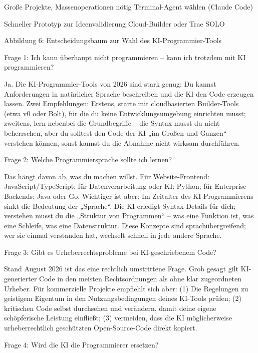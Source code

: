 Große Projekte, Massenoperationen nötig Terminal-Agent wählen (Claude Code)

Schneller Prototyp zur Ideenvalidierung Cloud-Builder oder Trae SOLO

\begin{center}\small\color{gray}Abbildung 6: Entscheidungsbaum zur Wahl des KI-Programmier-Tools\end{center}


Frage 1: Ich kann überhaupt nicht programmieren – kann ich trotzdem mit KI programmieren?

Ja. Die KI-Programmier-Tools von 2026 sind stark genug: Du kannst Anforderungen in natürlicher Sprache beschreiben und die KI den Code erzeugen lassen. Zwei Empfehlungen: Erstens, starte mit cloudbasierten Builder-Tools (etwa v0 oder Bolt), für die du keine Entwicklungsumgebung einrichten musst; zweitens, lern nebenbei die Grundbegriffe – die Syntax musst du nicht beherrschen, aber du solltest den Code der KI „im Großen und Ganzen“ verstehen können, sonst kannst du die Abnahme nicht wirksam durchführen.

Frage 2: Welche Programmiersprache sollte ich lernen?

Das hängt davon ab, was du machen willst. Für Website-Frontend: JavaScript/TypeScript; für Datenverarbeitung oder KI: Python; für Enterprise-Backends: Java oder Go. Wichtiger ist aber: Im Zeitalter des KI-Programmierens sinkt die Bedeutung der „Sprache“. Die KI erledigt Syntax-Details für dich; verstehen musst du die „Struktur von Programmen“ – was eine Funktion ist, was eine Schleife, was eine Datenstruktur. Diese Konzepte sind sprachübergreifend; wer sie einmal verstanden hat, wechselt schnell in jede andere Sprache.

Frage 3: Gibt es Urheberrechtsprobleme bei KI-geschriebenem Code?

Stand August 2026 ist das eine rechtlich umstrittene Frage. Grob gesagt gilt KI-generierter Code in den meisten Rechtsordnungen als ohne klar zugeordneten Urheber. Für kommerzielle Projekte empfiehlt sich aber: (1) Die Regelungen zu geistigem Eigentum in den Nutzungsbedingungen deines KI-Tools prüfen; (2) kritischen Code selbst durchsehen und verändern, damit deine eigene schöpferische Leistung einfließt; (3) vermeiden, dass die KI möglicherweise urheberrechtlich geschützten Open-Source-Code direkt kopiert.

Frage 4: Wird die KI die Programmierer ersetzen?


